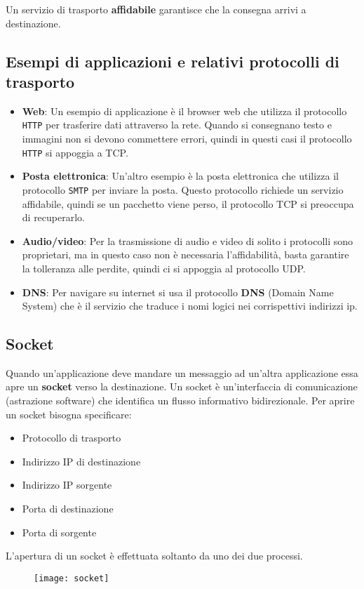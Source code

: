 \documentclass[a4paper]{article}
\begin{document}
\noindent
Un servizio di trasporto \textbf{affidabile} garantisce che la consegna arrivi a destinazione.

\subsection{Esempi di applicazioni e relativi protocolli di trasporto}
\begin{itemize}
  \item \textbf{Web}:
  Un esempio di applicazione è il browser web che utilizza il protocollo \texttt{HTTP}
  per trasferire dati attraverso la rete. Quando si consegnano testo e immagini
  non si devono commettere errori, quindi in questi casi il protocollo \texttt{HTTP}
  si appoggia a TCP.

  \item \textbf{Posta elettronica}:
  Un'altro esempio è la posta elettronica che utilizza il protocollo \texttt{SMTP}
  per inviare la posta. Questo protocollo richiede un servizio affidabile, quindi
  se un pacchetto viene perso, il protocollo TCP si preoccupa di recuperarlo.

  \item \textbf{Audio/video}:
  Per la trasmissione di audio e video di solito i protocolli sono proprietari, ma in
  questo caso non è necessaria l'affidabilità, basta garantire la tolleranza alle
  perdite, quindi ci si appoggia al protocollo UDP.

  \item \textbf{DNS}:
  Per navigare su internet si usa il protocollo \textbf{DNS} (Domain Name System)
  che è il servizio che traduce i nomi logici nei corrispettivi indirizzi ip.
\end{itemize}

\subsection{Socket}
Quando un'applicazione deve mandare un messaggio ad un'altra applicazione essa apre
un \textbf{socket} verso la destinazione. Un socket è un'interfaccia di comunicazione 
(astrazione software) che identifica un flusso informativo bidirezionale. Per aprire un
socket bisogna specificare:
\begin{itemize}
  \item Protocollo di trasporto
  \item Indirizzo IP di destinazione
  \item Indirizzo IP sorgente
  \item Porta di destinazione
  \item Porta di sorgente
\end{itemize}
L'apertura di un socket è effettuata soltanto da uno dei due processi.
\begin{figure}[H]
  \centering
  \texttt{[image: socket]}
\end{figure}
\end{document}
